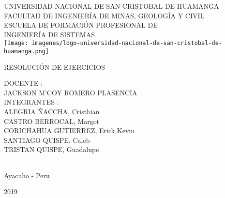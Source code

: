 \documentclass[10pt,a4paper]{article}
\begin{document}
\begin{center}
\Large{UNIVERSIDAD NACIONAL DE SAN CRISTOBAL DE HUAMANGA}\\
\vspace{1cm}
\Large{FACULTAD DE INGENIERÍA DE MINAS, GEOLOGÍA Y CIVIL}\\
\vspace{1cm}
\Large{ESCUELA DE FORMACIÓN PROFESIONAL DE}\\
\Large{INGENIERÍA DE SISTEMAS}\\
\texttt{[image: imagenes/logo-universidad-nacional-de-san-cristobal-de-huamanga.png]}
  
\vspace{1cm}
\Large{RESOLUCIÓN DE EJERCICIOS}\\
\vspace{1cm}
\end{center}
\Large{DOCENTE :}\\
\vspace{1cm}
\hspace*{5cm}\Large{JACKSON M’COY ROMERO PLASENCIA}\\
\Large{INTEGRANTES :}\\
\vspace{0.3cm}
\hspace*{5cm}\Large{ALEGRIA ÑACCHA, Cristhian}\\
\vspace{0.3cm}
\hspace*{5cm}\Large{CASTRO BERROCAL, Margot}\\
\vspace{0.3cm}
\hspace*{5cm}\Large{CORICHAHUA GUTIERREZ, Erick Kevin}\\
\vspace{0.3cm}
\hspace*{5cm}\Large{SANTIAGO QUISPE, Caleb}\\
\vspace{0.3cm}
\hspace*{5cm}\Large{TRISTAN QUISPE, Guadalupe}\\
\vspace{0.3cm}
\vspace*{3cm}\\
\Large\centerline{Ayacuho - Peru}
\Large\centerline{2019} 
\newpage
\end{document}
